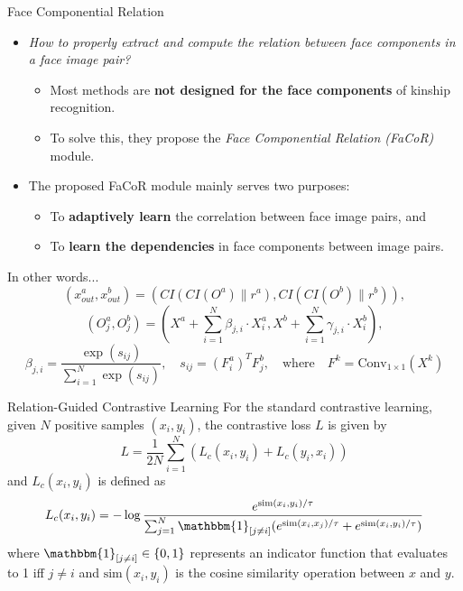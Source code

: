 \documentclass[aspectratio=169,xcolor=dvipsnames]{beamer}
\begin{document}
\begin{frame}{Face Componential Relation}
    \begin{itemize}
        \item \textit{How to properly extract and compute the relation between face components in a face image pair?}
            \begin{itemize}
                \item Most methods are \textbf{not designed for the face components} of kinship recognition.
                \item To solve this, they propose the \textit{Face Componential Relation (FaCoR)} module.
            \end{itemize}
        \pause
        \item The proposed FaCoR module mainly serves two purposes:
        \pause
            \begin{itemize}
                \item To \textbf{adaptively learn} the correlation between face image pairs, and
                \item To \textbf{learn the dependencies} in face components between image pairs.
            \end{itemize}
    \end{itemize} 
    \pause
    \begin{block}{In other words...}
        \tiny
        \[ (x_{out}^a, x_{out}^b) = (CI(CI(O^a) \parallel r^a), CI(CI(O^b) \parallel r^b)), \]
        \[ (O^a_j, O^b_j) = \left( X^a + \sum_{i=1}^N \beta_{j,i} \cdot X^a_i, X^b + \sum_{i=1}^N \gamma_{j,i} \cdot X^b_i \right), \]
        \[ \beta_{j,i} = \frac{\exp(s_{ij})}{\sum_{i=1}^N \exp(s_{ij})}, \quad s_{ij} = (F^a_i)^T F^b_j, \quad \text{where} \quad F^k = \text{Conv}_{1\times1}(X^k) \] 
    \end{block}

\end{frame}


\begin{frame}{Relation-Guided Contrastive Learning}
    For the standard contrastive learning, given $N$ positive samples $(x_i, y_i)$,  the contrastive loss $L$ is given by
    \begin{equation}
      L = \frac{1}{2N} \sum_{i=1}^N \left( L_c(x_i, y_i) + L_c(y_i, x_i) \right)
    \end{equation}
    and $L_c(x_i, y_i)$ is defined as
    \begin{equation}
      L_c(x_i, y_i) = -\log \frac{e^{\text{sim}(x_i, y_i)/\tau}}{\sum_{j=1}^N \mathbbm{1}_{[j \neq i]} (e^{\text{sim}(x_i, x_j)/\tau} + e^{\text{sim}(x_i, y_i)/\tau})}
    \end{equation}
    where $\mathbbm{1}_{[j \neq i]} \in \{0, 1\}$ represents an indicator function that evaluates to 1 iff $j \neq i$ and $\text{sim}(x_i, y_i)$ is the cosine similarity operation between $x$ and $y$.
\end{frame}
\end{document}

